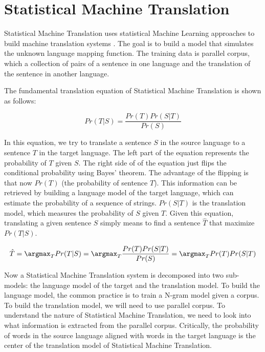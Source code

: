   


\section{Statistical Machine Translation}
Statistical Machine Translation uses statistical Machine Learning approaches to build machine translation systems \citep{brown1988statistical, brown1990statistical, brown1993mathematics, koehn2009statistical, moses}. The goal is to build a model that simulates the unknown language mapping function. The training data is parallel corpus, which a collection of pairs of a sentence in one language and the translation of the sentence in another language.

The fundamental translation equation of Statistical Machine Translation is shown as follows:

\begin{equation}
Pr(T|S)=\frac{Pr(T)Pr(S|T)}{Pr(S)}
\end{equation}

In this equation, we try to translate a sentence $S$ in the source language to a sentence $T$ in the target language. The left part of the equation represents the probability of $T$ given $S$. 
The right side of of the equation just flips the conditional probability using Bayes' theorem. 
The advantage of the flipping is that now $Pr(T)$ (the probability of sentence $T$). 
This information can be retrieved by building a language model of the target language, which can estimate the probability of a sequence of strings. $Pr(S|T)$ is the translation model, which measures the probability of $S$ given $T$. 
Given this equation, translating a given sentence $S$ simply means to find a sentence $\hat{T}$ that maximize $Pr(T|S)$.   

\begin{equation}
\hat{T}= \argmax_{T} Pr(T|S) = \argmax_{T} \frac{Pr(T)Pr(S|T)}{Pr(S)} = \argmax_{T} Pr(T)Pr(S|T)
\end{equation}

Now a Statistical Machine Translation system is decomposed into two sub-models: the language model of the target and the translation model. 
To build the language model, the common practice is to train a N-gram model given a corpus. 
To build the translation model, we will need to use parallel corpus. 
To understand the nature of Statistical Machine Translation, we need to look into what information is extracted from the parallel corpus. Critically, the probability of words in the source language aligned with words in the target language is the center of the translation model of Statistical Machine Translation. 

